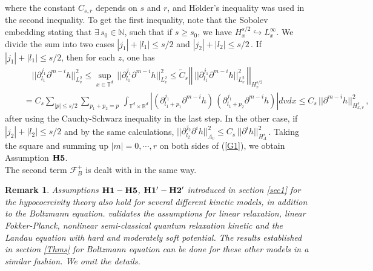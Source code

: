 \documentclass[final,onefignum,onetabnum]{siamart171218}
\newtheorem{remark}[theorem]{Remark}
\begin{document}
where the constant $C_{s,r}$ depends on $s$ and $r$, and H$\ddot{o}$lder's inequality was used in the second inequality.
To get the first inequality, note that the Sobolev embedding stating that $\exists\, s_0\in \mathbb N$,
such that if $s\geq s_0$, we have $H_{x}^{s/2} \hookrightarrow L_{x}^{\infty}$. We divide the sum into two cases $|j_1|+|l_1|\leq s/2$ and $|j_2|+|l_2|\leq s/2$\,.
If $|j_1|+|l_1|\leq s/2$, then for each $z$, one has
\begin{align*}
&\displaystyle\qquad ||\partial_{l_1}^{j_1}\partial^{m-i}h||_{L^2_{v}}^2 \leq \sup_{x\in\mathbb T^{d}}\,  ||\partial_{l_1}^{j_1}\partial^{m-i}h||_{L^2_{v}}^2
\leq \widetilde C_{s} \left|\left|\, ||\partial_{l_1}^{j_1}\partial^{m-i}h||_{L^2_v}^2\, \right|\right|_{H_{x}^{s/2}} \\[2pt]
&\displaystyle\quad = C_s \sum_{|p|\leq s/2}\sum_{p_1+p_2=p}\, \int_{\mathbb T^{d}\times\mathbb R^{d}} \left| (\partial_{l_1+p_1}^{j_1}\partial^{m-i}h)\, (\partial_{l_1+p_2}^{j_1}
\partial^{m-i}h)\right| dvdx \leq C_s\, ||\partial^{m-i}h||_{H_{x,v}^{s}}^2\,,
\end{align*}
after using the Cauchy-Schwarz inequality in the last step. 
In the other case, if $|j_2|+|l_2|\leq s/2$ and by the same calculations,
$ ||\partial_{l_2}^{j_2}\partial^i h||_{\Lambda_v}^2 \leq C_s\, ||\partial^i h||_{H_{\Lambda}^{s}}^2$\,. Taking the square and summing up
$|m|=0, \cdots, r$ on both sides of (\ref{G1}), we obtain Assumption ${\bf H5}$. \\
The second term $\mathcal F_{B}^{+}$ is dealt with in the same way.

\begin{remark}
Assumptions ${\bf H1-H5}$, ${\bf H1^{\prime}-H2^{\prime}}$ introduced in section \ref{sec1} for the hypocoercivity theory also
hold for several different kinetic models, in addition to the Boltzmann equation.
\cite{CN} validates the assumptions for linear relaxation, linear Fokker-Planck,
nonlinear semi-classical quantum relaxation kinetic and the Landau equation with hard and moderately soft potential.
The results established in section \ref{Thms} for Boltzmann equation can be done for these other models in a similar fashion.
We omit the details. 
\end{remark}

\end{document}

